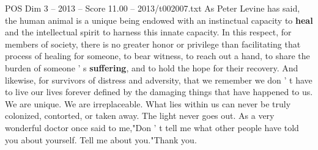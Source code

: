 \begin{textsample}{POS Dim 3 – 2013 – Score 11.00 – 2013/t002007.txt}
As Peter Levine has said, the human animal is a unique being endowed with an instinctual capacity to \textbf{heal} and the intellectual spirit to harness this innate capacity.
In this respect, for members of society, there is no greater honor or privilege than facilitating that process of healing for someone, to bear witness, to reach out a hand, to share the burden of someone ' s \textbf{suffering}, and to hold the hope for their recovery.
And likewise, for survivors of distress and adversity, that we remember we don ' t have to live our lives forever defined by the damaging things that have happened to us.
We are unique.
We are irreplaceable.
What lies within us can never be truly colonized, contorted, or taken away.
The light never goes out.
As a very wonderful doctor once said to me,"Don ' t tell me what other people have told you about yourself.
Tell me about you."Thank you.

\end{textsample}
